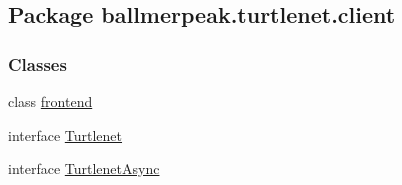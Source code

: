 \hypertarget{namespaceballmerpeak_1_1turtlenet_1_1client}{\subsection{Package ballmerpeak.\-turtlenet.\-client}
\label{namespaceballmerpeak_1_1turtlenet_1_1client}
}
\subsubsection*{Classes}
\begin{DoxyCompactItemize}
\item 
class \hyperlink{classballmerpeak_1_1turtlenet_1_1client_1_1frontend}{frontend}
\item 
interface \hyperlink{interfaceballmerpeak_1_1turtlenet_1_1client_1_1Turtlenet}{Turtlenet}
\item 
interface \hyperlink{interfaceballmerpeak_1_1turtlenet_1_1client_1_1TurtlenetAsync}{Turtlenet\-Async}
\end{DoxyCompactItemize}
